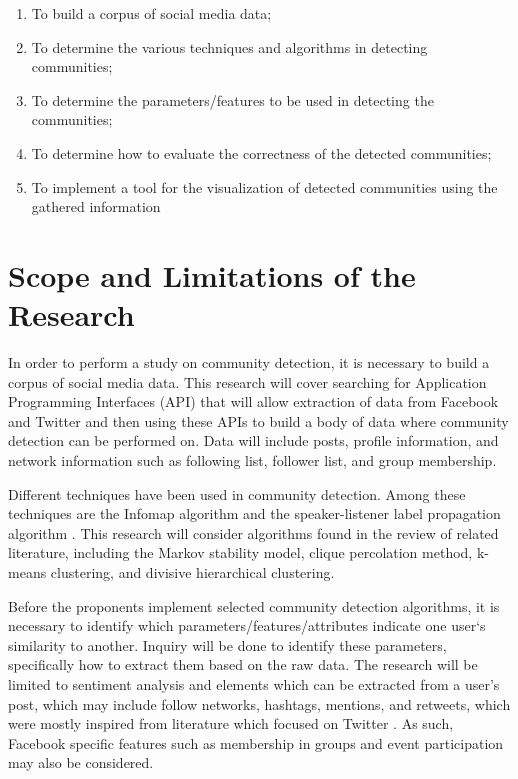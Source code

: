 \begin{enumerate}
	\item To build a corpus of social media data;
	\item To determine the various techniques and algorithms in detecting communities;
	\item To determine the parameters/features to be used in detecting the communities;
	\item To determine how to evaluate the correctness of the detected communities;
	\item To implement a tool for the visualization of detected communities using the gathered information
\end{enumerate}

\section{Scope and Limitations of the Research}
\label{sec:scopelimitations}

In order to perform a study on community detection, it is necessary to build a corpus of social media data. This research will cover searching for Application Programming Interfaces (API) that will allow extraction of data from Facebook and Twitter and then using these APIs to build a body of data where community detection can be performed on. Data will include posts, profile information, and network information such as following list, follower list, and group membership.

Different techniques have been used in community detection. Among these techniques are the Infomap algorithm and the speaker-listener label propagation algorithm \cite{Deitrick:2013}.  This research will consider algorithms found in the review of related literature, including the Markov stability model, clique percolation method, k-means clustering, and divisive hierarchical clustering.

Before the proponents implement selected community detection algorithms, it is necessary to identify which parameters/features/attributes indicate one user`s similarity to another. Inquiry will be done to identify these parameters, specifically how to extract them based on the raw data. The research will be limited to sentiment analysis and elements which can be extracted from a user’s post, which may include follow networks, hashtags, mentions, and retweets, which were mostly inspired from literature which focused on Twitter \cite{Deitrick:2013,Zhang:2012,Lim:2012:1}. As such, Facebook specific features such as membership in groups and event participation may also be considered.

